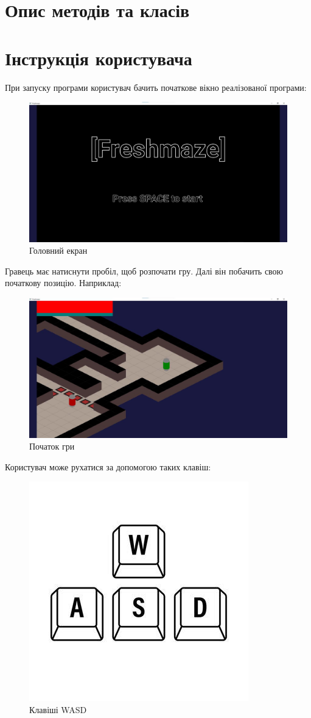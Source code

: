 \documentclass{article}
\begin{document}
\section{Опис методів та класів}

\section{Інструкція користувача}
При запуску програми користувач бачить початкове вікно реалізованої
програми:
\begin{figure}[H]
	\centering
	\includegraphics[width=0.9 \textwidth]{1}
	\caption{Головний екран}
\end{figure}
Гравець має натиснути пробіл, щоб розпочати гру. Далі він побачить свою
початкову позицію. Наприклад:
\begin{figure}[H]
	\centering
	\includegraphics[width=0.9 \textwidth]{2}
	\caption{Початок гри}
\end{figure}
Користувач може рухатися за допомогою таких клавіш:
\begin{figure}[H]
	\centering
	\includegraphics[width=0.5 \textwidth]{3}
	\caption{Клавіші WASD}
\end{figure}
\end{document}
